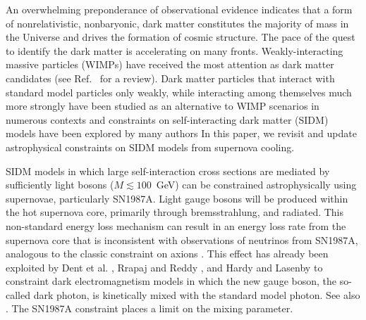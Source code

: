 \documentclass[nofootinbib,prd,superscriptaddress,twocolumn]{revtex4}
\begin{document}
An overwhelming preponderance of observational evidence indicates that a form of nonrelativistic, nonbaryonic, 
dark matter constitutes the majority of mass in the Universe and drives the formation of cosmic structure. 
The pace of the quest to identify the dark matter is accelerating on many fronts. Weakly-interacting massive 
particles (WIMPs) have received the most attention as dark matter candidates (see Ref.~\cite{jungman_etal96} for a review). 
Dark matter particles that interact with standard model particles only weakly, while interacting among themselves 
much more strongly have been studied as an alternative to WIMP scenarios in numerous contexts 
\cite{carlson_etal92,deLaix_etal95,atrio-barandela_davidson97,spergel_steinhardt00,hogan_dalcanton00,mohapatra_teplitz00,
dave_etal01,hisano_etal04,hisano_etal05,pospelov_etal08,arkani-hamed_etal08a,lattanzi_silk08,ackerman_etal09,feng_etal09,
kong_etal15,Buckley:2009in,Boddy:2014yra,Boddy:2014qxa,Boddy:2016bbu}
and constraints on self-interacting dark matter (SIDM) models have been explored by many authors \cite{yoshida_etal00,gnedin_ostriker01,miralda-escude02,randall_etal08,kamionkowski_profumo08,zentner09,robertson_zentner09,pieri_etal09,spolyar_etal09,finkbeiner_etal09,slatyer_etal09,bramante_etal14,albuquerque_etal14,kaplinghat_etal14,chen_etal14,feng_etal16,catena_widmark16,Markevitch:2003at,Zavala:2012us,Rocha:2012jg,Peter:2012jh,Kahlhoefer:2013dca,Elbert:2014bma,Feng:2015hja,DelNobile:2015uua,Feng:2016ijc,Dooley:2016ajo,Kim:2016ujt,Bringmann:2016din} 
In this paper, we revisit and update astrophysical constraints on SIDM models from supernova cooling.


SIDM models in which large self-interaction cross sections are mediated by sufficiently light 
bosons ($M \lesssim 100$~GeV) can be constrained astrophysically using supernovae, particularly 
SN1987A. Light gauge bosons will be produced within the hot supernova core, primarily through 
bremsstrahlung, and radiated. This non-standard energy loss mechanism can result in an energy loss rate 
from the supernova core that is inconsistent with observations of neutrinos from SN1987A, 
analogous to the classic constraint on axions \cite{turner88,raffelt96_book}. 
This effect has already been exploited by Dent et al. \cite{dent_etal12}, Rrapaj and Reddy \cite{rrapaj_reddy16}, and 
Hardy and Lasenby \cite{hardy_lasenby17} 
to constraint dark electromagnetism models in which the new gauge boson, the so-called dark photon, 
is kinetically mixed with the standard model photon. See also \cite{Kazanas:2014mca,Zhang:2014wra,Chang:2016ntp}. The SN1987A constraint places a limit on the mixing parameter. 
\end{document}
